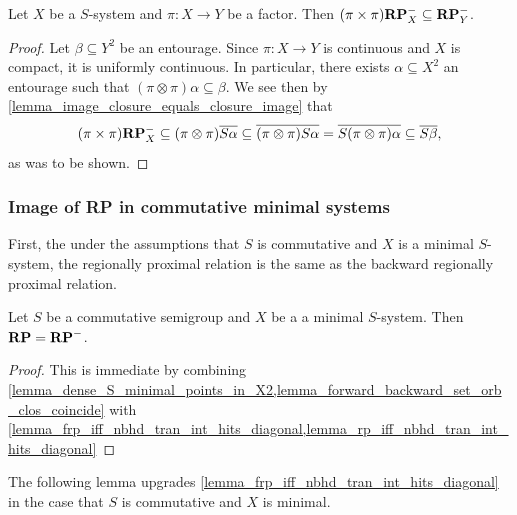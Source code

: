 \begin{lemma}
    \label{lemma_rp_functorial_property}
    \leanok{}
    Let $X$ be a $S$-system and $\pi: X \to Y$ be a factor.  Then $(\pi \times \pi) \mathbf{RP}^-_X \subseteq \mathbf{RP}^-_Y$.
\end{lemma}

\begin{proof}
\leanok{}
    Let $\beta \subseteq Y^2$ be an entourage.  Since $\pi: X \to Y$ is continuous and $X$ is compact, it is uniformly continuous.  In particular, there exists $\alpha \subseteq X^2$ an entourage such that $(\pi \otimes \pi) \alpha \subseteq \beta$.  We see then by \cref{lemma_image_closure_equals_closure_image} that
    \[
        (\pi \times \pi) \mathbf{RP}^-_X \subseteq (\pi \otimes \pi) \overline{S \alpha} \subseteq \overline{(\pi \otimes \pi) S \alpha} = \overline{S(\pi \otimes \pi) \alpha} \subseteq \overline{S \beta},\]
    as was to be shown.
\end{proof}

\subsubsection{Image of RP in commutative minimal systems}

First, the under the assumptions that $S$ is commutative and $X$ is a minimal $S$-system, the regionally proximal relation is the same as the backward regionally proximal relation.

\begin{theorem}
    \label{thm_forward_equals_backward_rp}
    \leanok{}
    Let $S$ be a commutative semigroup and $X$ be a a minimal $S$-system. Then $\mathbf{RP} = \mathbf{RP}^-$.
\end{theorem}

\begin{proof}
    This is immediate by combining \cref{lemma_dense_S_minimal_points_in_X2,lemma_forward_backward_set_orb_clos_coincide} with \cref{lemma_frp_iff_nbhd_tran_int_hits_diagonal,lemma_rp_iff_nbhd_tran_int_hits_diagonal}
\end{proof}

The following lemma upgrades \cref{lemma_frp_iff_nbhd_tran_int_hits_diagonal} in the case that $S$ is commutative and $X$ is minimal.

